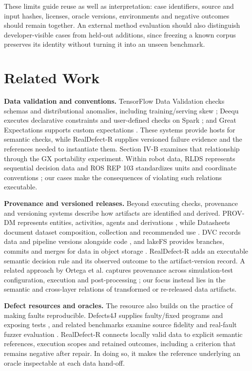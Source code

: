 \documentclass[conference]{IEEEtran}
\begin{document}
These limits guide reuse as well as interpretation: case identifiers, source and input hashes, licenses, oracle versions, environments and negative outcomes should remain together. An external method evaluation should also distinguish developer-visible cases from held-out additions, since freezing a known corpus preserves its identity without turning it into an unseen benchmark.\par

\section{Related Work}

\textbf{Data validation and conventions.} TensorFlow Data Validation checks schemas and distributional anomalies, including training/serving skew \cite{16}; Deequ executes declarative constraints and user-defined checks on Spark \cite{17}; and Great Expectations supports custom expectations \cite{18}. These systems provide hosts for semantic checks, while \mbox{RealDefect-R} supplies versioned failure evidence and the references needed to instantiate them. Section IV-B examines that relationship through the GX portability experiment. Within robot data, RLDS represents sequential decision data \cite{9} and ROS REP 103 standardizes units and coordinate conventions \cite{10}; our cases make the consequences of violating such relations executable.\par

\textbf{Provenance and versioned releases.} Beyond executing checks, provenance and versioning systems describe how artifacts are identified and derived. PROV-DM represents entities, activities, agents and derivations \cite{19}, while Datasheets document dataset composition, collection and recommended use \cite{20}. DVC records data and pipeline versions alongside code \cite{27}, and lakeFS provides branches, commits and merges for data in object storage \cite{28}. \mbox{RealDefect-R} adds an executable semantic decision rule and its observed outcome to the artifact-version record. A related approach by Ortega et al. captures provenance across simulation-test configuration, execution and post-processing \cite{25}; our focus instead lies in the semantic and cross-layer relations of transformed or re-released data artifacts.\par

\textbf{Defect resources and oracles.} The resource also builds on the practice of making faults reproducible. Defects4J supplies faulty/fixed programs and exposing tests \cite{11}, and related benchmarks examine source fidelity \cite{30} and real-fault fuzzer evaluation \cite{31}. \mbox{RealDefect-R} connects locally valid data to explicit semantic references, execution scopes and retained outcomes, including a criterion that remains negative after repair. In doing so, it makes the reference underlying an oracle \cite{12} inspectable at each data hand-off.\par
\end{document}
